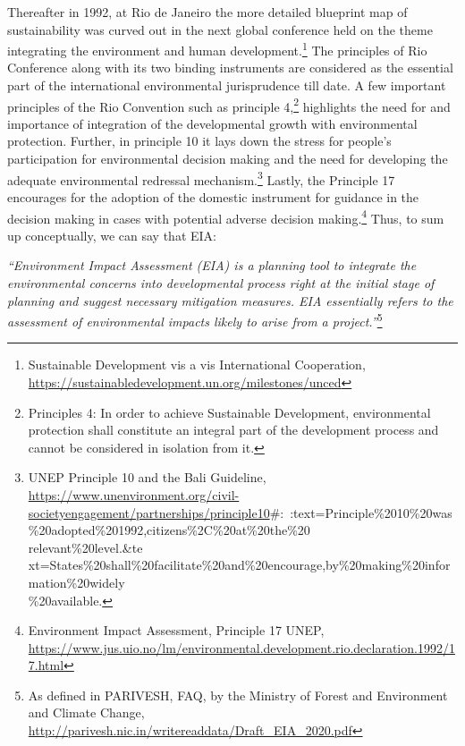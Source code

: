 \begin{multicols}{2}
\noi
Thereafter in 1992, at Rio de Janeiro the more detailed blueprint map of sustainability was
curved out in the next global conference held on the theme integrating the environment and
human development.\footnote{Sustainable Development vis a vis International Cooperation, \url{https://sustainabledevelopment.un.org/milestones/unced}}
 The principles of Rio Conference along with its two binding
instruments are considered as the essential part of the international environmental
jurisprudence till date. A few important principles of the Rio Convention such as principle 4,\footnote{Principles 4: In order to achieve Sustainable Development, environmental protection shall constitute an integral part of the development process and cannot be considered in isolation from it.}
highlights the need for and importance of integration of the developmental growth with environmental protection. Further, in principle 10 it lays down the stress for people’s
participation for environmental decision making and the need for developing the adequate
environmental redressal mechanism.\footnote{UNEP Principle 10 and the Bali Guideline, \url{https://www.unenvironment.org/civil-societyengagement/partnerships/principle10}\#:~:text=Principle\%2010\%20was\%20adopted\%201992,citizens\%2C\%20at\%20the\%20\\relevant\%20level.\&te xt=States\%20shall\%20facilitate\%20and\%20encourage,by\%20making\%20information\%20widely\\\%20available.}
 Lastly, the Principle 17 encourages for the adoption of
the domestic instrument for guidance in the decision making in cases with potential adverse
decision making.\footnote{Environment Impact Assessment, Principle 17 UNEP,\\
\url{https://www.jus.uio.no/lm/environmental.development.rio.declaration.1992/17.html}}
 Thus, to sum up conceptually, we can say that EIA:

\noi
\textit{“Environment Impact Assessment (EIA) is a planning tool to integrate the environmental
concerns into developmental process right at the initial stage of planning and suggest
necessary mitigation measures. EIA essentially refers to the assessment of environmental
impacts likely to arise from a project.”}\footnote{As defined in PARIVESH, FAQ, by the Ministry of Forest and Environment and Climate Change,
\url{http://parivesh.nic.in/writereaddata/Draft_EIA_2020.pdf}}


\end{multicols}
